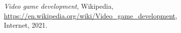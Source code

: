 
\begin{thebibliography}{x}

	\emph{Video game development}, Wikipedia, \\
	\url{https://en.wikipedia.org/wiki/Video_game_development}, \\
	Internet, 2021.



\end{thebibliography}

